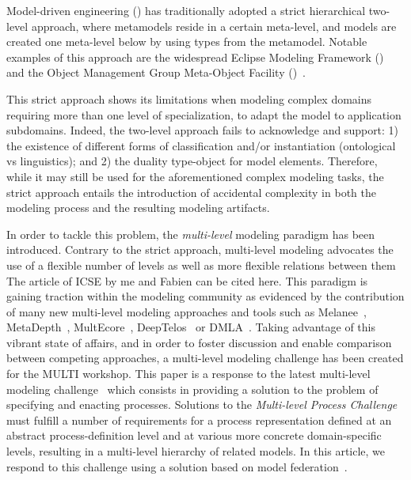 Model-driven engineering (\MDE) has traditionally adopted a strict hierarchical two-level approach, where metamodels reside in a certain meta-level, and models are created one meta-level below by using types from the metamodel. Notable examples of this approach are the widespread Eclipse Modeling Framework (\EMF)~\parencite{emf} and the Object Management Group Meta-Object Facility (\MOF)~\parencite{omg2013mof}.

This strict approach shows its limitations when modeling complex domains requiring more than one level of specialization, \eg to adapt the model to application subdomains. Indeed, the two-level approach fails to acknowledge and support: 1) the existence of different forms of classification and/or instantiation (\eg ontological vs linguistics); and 2) the duality type-object for model elements. Therefore, while it may still be used for the aforementioned complex modeling tasks, the strict approach entails the introduction of accidental complexity in both the modeling process and the resulting modeling artifacts.

In order to tackle this problem, the \emph{multi-level} modeling paradigm has been introduced. Contrary to the strict approach, multi-level modeling advocates the use of a flexible number of levels as well as more flexible relations between them{\color{red} The article of ICSE by me and Fabien can be cited here}. This paradigm is gaining traction within the modeling community as evidenced by the contribution of many new multi-level modeling approaches and tools such as Melanee~\parencite{melanee}, MetaDepth~\parencite{metadepth}, MultEcore~\parencite{multecore2016}, DeepTelos~\parencite{deeptelos2016} or DMLA~\parencite{dmla2017}. Taking advantage of this vibrant state of affairs, and in order to foster discussion and enable comparison between competing approaches, a multi-level modeling challenge has been created for the MULTI workshop. This paper is a response to the latest multi-level modeling challenge~\parencite{multiProcessChallenge-emisaj}
which consists in providing a solution to the problem of specifying and enacting processes. Solutions to the \emph{Multi-level Process Challenge} must fulfill a number of requirements for a process representation defined at an abstract process-definition level and at various more concrete domain-specific levels, resulting in a multi-level hierarchy of related models. In this article, we respond to this challenge using a solution based on model federation~\parencite{Golra2016-federation}.

